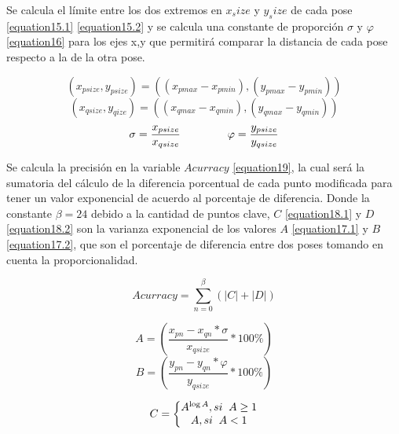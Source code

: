 Se calcula el límite entre los dos extremos en $x_size$ y $y_size$ de cada pose \ref{equation15.1} \ref{equation15.2} y se calcula una constante de proporción $\sigma$ y $\varphi$ \ref{equation16} para los ejes x,y que permitirá comparar la distancia de cada pose respecto a la de la otra pose.

\begin{equation}
(x_{psize},y_{psize}) = ((x_{pmax}-x_{pmin}),(y_{pmax}-y_{pmin}))
\label{equation15.1}
\end{equation}
\begin{equation}
(x_{qsize},y_{qize}) = ((x_{qmax}-x_{qmin}),(y_{qmax}-y_{qmin}))
\label{equation15.2}
\end{equation}
\begin{equation}
\sigma = \frac{x_{psize}}{x_{qsize}} \hspace{15mm} \varphi = \frac{y_{psize}}{y_{qsize}}  
\label{equation16}
\end{equation}

Se calcula la precisión en la variable $Acurracy$ \ref{equation19}, la cual será la sumatoria del cálculo de la diferencia porcentual de cada punto modificada para tener un valor exponencial de acuerdo al porcentaje de diferencia. Donde la constante $\beta = 24$ debido a la cantidad de puntos clave, $C$ \ref{equation18.1} y $D$ \ref{equation18.2} son la varianza exponencial de los valores $A$ \ref{equation17.1} y $B$ \ref{equation17.2}, que son el porcentaje de diferencia entre dos poses tomando en cuenta la proporcionalidad.

\begin{equation}
Acurracy = \sum_{n=0}^\beta (\left | C \right |  +  \left |  D \right |) 
\label{equation19}
\end{equation}

\begin{equation}
A=(\frac{x_{pn}-x_{qn}*\sigma}{x_{qsize}} *100 \% )
\label{equation17.1}
\end{equation}
\begin{equation}
B=(\frac{y_{pn}-y_{qn}*\varphi}{y_{qsize}} *100 \% )
\label{equation17.2}
\end{equation}

\begin{equation}
C=\left\{\begin{matrix}
A^{\log A} , si \hspace{2mm} A \geq 1  \\
A , si \hspace{2mm} A <  1
\end{matrix}\right. 
\label{equation18.1}
\end{equation}


